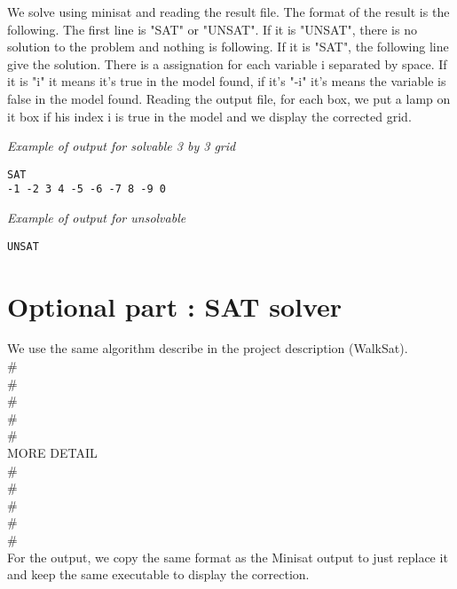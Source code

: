 \documentclass[a4paper]{article}
\begin{document}
We solve using minisat and reading the result file. The format of the result is the following.
The first line is "SAT" or "UNSAT".
If it is "UNSAT", there is no solution to the problem and nothing is following.
If it is "SAT", the following line give the solution. There is a assignation for each variable i separated by space. If it is "i" it means it's true in the model found, if it's "-i" it's means the variable is false in the model found.
Reading the output file, for each box, we put a lamp on it box if his index i is true in the model and we display the corrected grid.\newline

\textit{Example of output for solvable 3 by 3 grid}
\begin{verbatim}
SAT
-1 -2 3 4 -5 -6 -7 8 -9 0

\end{verbatim}

\textit{Example of output for unsolvable}
\begin{verbatim}
UNSAT

\end{verbatim}

\section{Optional part : SAT solver}

We use the same algorithm describe in the project description (WalkSat).\\
\# \\
\# \\
\# \\
\# \\
\# \\
MORE DETAIL \\
\# \\
\# \\
\# \\
\# \\
\# \\

For the output, we copy the same format as the Minisat output to just replace it and keep the same executable to display the correction.
\end{document}
